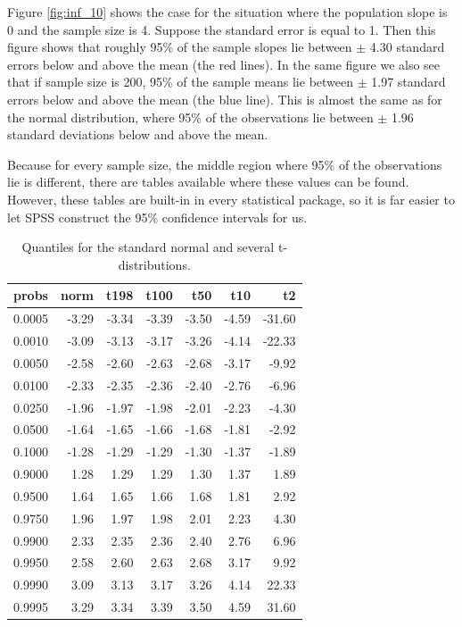 \documentclass[]{report}\usepackage[]{graphicx}\usepackage[]{color}
\begin{document}
Figure \ref{fig:inf_10} shows the case for the situation where the population slope is 0 and the sample size is 4. Suppose the standard error is equal to 1. Then this figure shows that roughly 95\% of the sample slopes lie between $\pm$ 4.30 standard errors below and above the mean (the red lines). In the same figure we also see that if sample size is 200, 95\% of the sample means lie between $\pm$ 1.97 standard errors below and above the mean (the blue line). This is almost the same as for the normal distribution, where 95\% of the observations lie between $\pm$ 1.96 standard deviations below and above the mean.

Because for every sample size, the middle region where 95\% of the observations lie is different, there are tables available where these values can be found. However, these tables are built-in in every statistical package, so it is far easier to let SPSS construct the 95\% confidence intervals for us.


\begin{table}[ht]
\centering
\caption{Quantiles for the standard normal and several t-distributions.} 
\label{tab:table_1}
\begin{tabular}{rrrrrrr}
  \hline
probs & norm & t198 & t100 & t50 & t10 & t2 \\ 
  \hline
0.0005 & -3.29 & -3.34 & -3.39 & -3.50 & -4.59 & -31.60 \\ 
  0.0010 & -3.09 & -3.13 & -3.17 & -3.26 & -4.14 & -22.33 \\ 
  0.0050 & -2.58 & -2.60 & -2.63 & -2.68 & -3.17 & -9.92 \\ 
  0.0100 & -2.33 & -2.35 & -2.36 & -2.40 & -2.76 & -6.96 \\ 
  0.0250 & -1.96 & -1.97 & -1.98 & -2.01 & -2.23 & -4.30 \\ 
  0.0500 & -1.64 & -1.65 & -1.66 & -1.68 & -1.81 & -2.92 \\ 
  0.1000 & -1.28 & -1.29 & -1.29 & -1.30 & -1.37 & -1.89 \\ 
  0.9000 & 1.28 & 1.29 & 1.29 & 1.30 & 1.37 & 1.89 \\ 
  0.9500 & 1.64 & 1.65 & 1.66 & 1.68 & 1.81 & 2.92 \\ 
  0.9750 & 1.96 & 1.97 & 1.98 & 2.01 & 2.23 & 4.30 \\ 
  0.9900 & 2.33 & 2.35 & 2.36 & 2.40 & 2.76 & 6.96 \\ 
  0.9950 & 2.58 & 2.60 & 2.63 & 2.68 & 3.17 & 9.92 \\ 
  0.9990 & 3.09 & 3.13 & 3.17 & 3.26 & 4.14 & 22.33 \\ 
  0.9995 & 3.29 & 3.34 & 3.39 & 3.50 & 4.59 & 31.60 \\ 
   \hline
\end{tabular}
\end{table}
\end{document}
